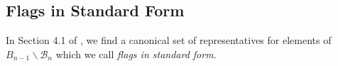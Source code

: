 \documentclass[12pt]{amsart}
\numberwithin{equation}{section}
\newcommand{\B}{\mathcal{B}}
\newcommand{\F}{\mathcal{F}}
\newcommand{\Borbitspace}{B_{n-1}\backslash\B_{n}}
\begin{document}



\subsection{Flags in Standard Form} 

In Section 4.1 of \cite{CE21II}, we find a canonical set of representatives for 
elements of $\Borbitspace$ which we call \emph{flags in standard form}.  
\end{document}
